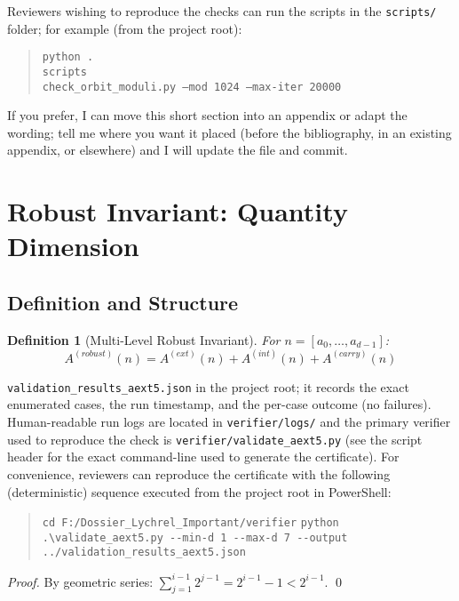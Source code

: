 \documentclass[12pt,a4paper]{article}
\newtheorem{definition}[theorem]{Definition}
\begin{document}
Reviewers wishing to reproduce the checks can run the scripts in the
	\texttt{scripts/} folder; for example (from the project root):
\begin{quote}\small
	\texttt{python .\\scripts\\check\_orbit\_moduli.py --mod 1024 --max-iter 20000}
\end{quote}

If you prefer, I can move this short section into an appendix or adapt the
wording; tell me where you want it placed (before the bibliography, in an
existing appendix, or elsewhere) and I will update the file and commit.

\section{Robust Invariant: Quantity Dimension}

\subsection{Definition and Structure}

\begin{definition}[Multi-Level Robust Invariant]\label{def:robust}
For $n = [a_0, \ldots, a_{d-1}]$:
$$A^{(robust)}(n) = A^{(ext)}(n) + A^{(int)}(n) + A^{(carry)}(n)$$
\end{definition} %
			\verb|validation_results_aext5.json|
in the project root; it records the exact enumerated cases, the run timestamp,
and the per-case outcome (no failures). Human-readable run logs are located in
		\texttt{verifier/logs/} and the primary verifier used to reproduce the check
is \verb|verifier/validate_aext5.py| (see the script header for the exact
command-line used to generate the certificate). For convenience, reviewers can
reproduce the certificate with the following (deterministic) sequence executed
from the project root in PowerShell:
\begin{quote}\small
	\verb|cd F:/Dossier_Lychrel_Important/verifier|
	\verb|python .\validate_aext5.py --min-d 1 --max-d 7 --output ../validation_results_aext5.json|
\end{quote}
\begin{proof}
By geometric series: $\sum_{j=1}^{i-1} 2^{j-1} = 2^{i-1} - 1 < 2^{i-1}$. \qed
\end{proof}
\end{document}
